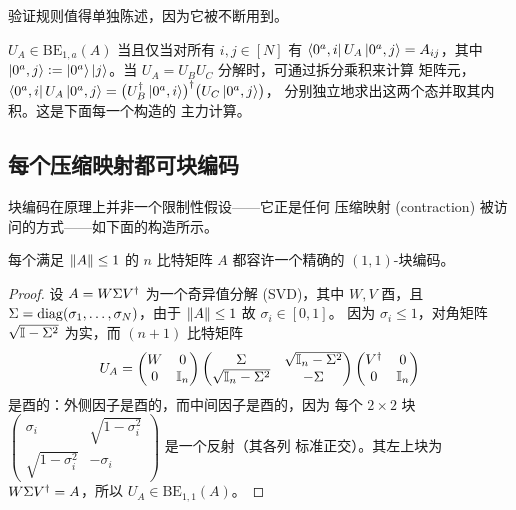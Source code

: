 验证规则值得单独陈述，因为它被不断用到。

\begin{remark}[逐元验证块编码]
\label{rem:lec06-verify}
$U_A\in\mathrm{BE}_{1,a}(A)$ 当且仅当对所有 $i,j\in[N]$ 有
$\bra{0^a,i}U_A\ket{0^a,j}=A_{ij}$，其中
$\ket{0^a,j}\vcentcolon=\ket{0^a}\ket{j}$。当 $U_A=U_BU_C$ 分解时，可通过拆分乘积来计算
矩阵元，
$\bra{0^a,i}U_A\ket{0^a,j}=\bigl(U_B^{\dagger}\ket{0^a,i}\bigr)^{\dagger}\bigl(U_C\ket{0^a,j}\bigr)$，
分别独立地求出这两个态并取其内积。这是下面每一个构造的
主力计算。
\end{remark}

\subsection*{每个压缩映射都可块编码}

块编码在原理上并非一个限制性假设——它正是任何
压缩映射 (contraction) 被访问的方式——如下面的构造所示。

\begin{proposition}[$(1,1)$-块编码对压缩映射是通用的]
\label{prop:lec06-svd}
每个满足 $\left\lVert A \right\rVert\le1$ 的 $n$ 比特矩阵 $A$ 都容许一个精确的
$(1,1)$-块编码。
\end{proposition}

\begin{proof}
设 $A=W\Sigma V^{\dagger}$ 为一个奇异值分解 (SVD)，其中 $W,V$ 酉，且
$\Sigma=\operatorname{diag}(\sigma_1,\dots,\sigma_N)$，由于 $\left\lVert A \right\rVert\le1$ 故 $\sigma_i\in[0,1]$。
因为 $\sigma_i\le1$，对角矩阵 $\sqrt{\mathbb{I}-\Sigma^2}$ 为实，而
$(n+1)$ 比特矩阵
\begin{equation}
  U_A=\begin{pmatrix} W & 0\\ 0 & \mathbb{I}_n\end{pmatrix}
      \begin{pmatrix} \Sigma & \sqrt{\mathbb{I}_n-\Sigma^2}\\
                      \sqrt{\mathbb{I}_n-\Sigma^2} & -\Sigma\end{pmatrix}
      \begin{pmatrix} V^{\dagger} & 0\\ 0 & \mathbb{I}_n\end{pmatrix}
  \label{eq:lec06-svd}
\end{equation}
是酉的：外侧因子是酉的，而中间因子是酉的，因为
每个 $2\times2$ 块 $\left(\begin{smallmatrix}\sigma_i&\sqrt{1-\sigma_i^2}\\
\sqrt{1-\sigma_i^2}&-\sigma_i\end{smallmatrix}\right)$ 是一个反射（其各列
标准正交）。其左上块为 $W\Sigma V^{\dagger}=A$，所以
$U_A\in\mathrm{BE}_{1,1}(A)$。
\end{proof}

